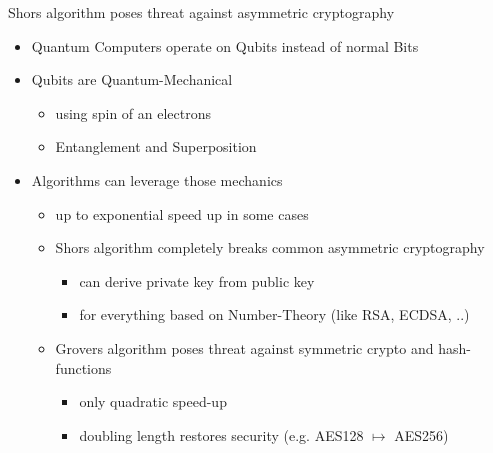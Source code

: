 \documentclass[ucs,10pt]{beamer}
\begin{document}
\begin{frame}{Shors algorithm poses threat against asymmetric cryptography}
  \begin{itemize}
  \item
    Quantum Computers operate on Qubits instead of normal Bits
  \item
    Qubits are Quantum-Mechanical
    \begin{itemize}
      \item using spin of an electrons
      \item Entanglement and Superposition
    \end{itemize}
  \item
    Algorithms can leverage those mechanics
    \begin{itemize}
      \item up to exponential speed up in some cases
      \item Shors algorithm completely breaks common asymmetric cryptography
      \begin{itemize}
        \item can derive private key from public key
        \item for everything based on Number-Theory (like RSA, ECDSA, ..)
      \end{itemize}
      \item  Grovers algorithm poses threat against symmetric crypto and hash-functions
      \begin{itemize}
        \item only quadratic speed-up
        \item doubling length restores security (e.g. AES128 $\mapsto$ AES256)
      \end{itemize}
    \end{itemize}
  \end{itemize}
\end{frame}
\end{document}
